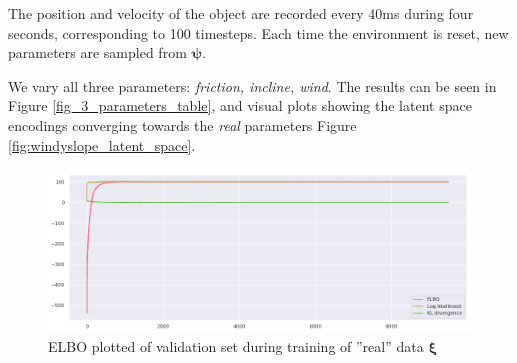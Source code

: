 \documentclass{kththesis}
\newcommand{\vpsi}{\vec{\psi}}
\renewcommand{\vec}[1]{\boldsymbol{#1}}
\newcommand{\cvae}{\textsc{cvae}}
\newcommand{\dettostoc}{\textsc{det2stoc}}
\begin{document}
The position and velocity of the object are recorded every 40ms during four seconds, corresponding to 100 timesteps. Each time the environment is reset, new parameters are sampled from $\vpsi$.


We vary all three parameters: \textit{friction, incline, wind}. The results can be seen in Figure \ref{fig_3_parameters_table}, and visual plots showing the latent space encodings converging towards the \emph{real} parameters Figure \ref{fig:windyslope_latent_space}.




\begin{figure}
    \centering
    \includegraphics[width=\textwidth]{img/windyslope/windyslope_elbo.png}
    \caption{ELBO plotted of validation set during training of ''real'' data $\vec{\xi}$}
    \label{fig:my_label}
\end{figure}
\end{document}

